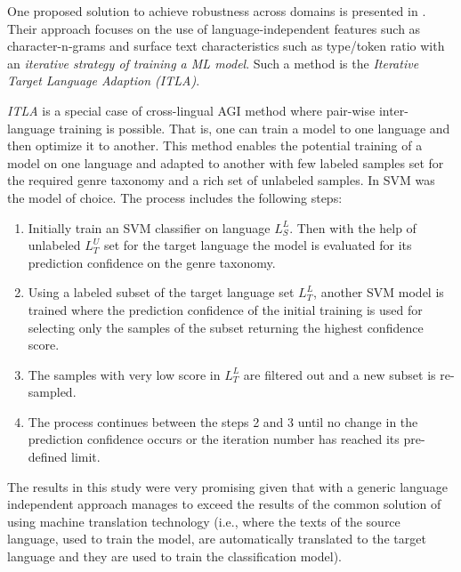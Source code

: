 One proposed solution to achieve robustness across domains is presented in \parencite{petrenz2011stable}. Their approach focuses on the use of language-independent features such as character-n-grams and surface text characteristics such as type/token ratio with an \textit{iterative strategy of training a ML model}. Such a method is the \textit{Iterative Target Language Adaption (ITLA)}. 

\textit{ITLA} is a special case of cross-lingual AGI method where pair-wise inter-language training is possible. That is, one can train a model to one language and then optimize it to another. This method enables the potential training of a model on one language and adapted to another with few labeled samples set for the required genre taxonomy and a rich set of unlabeled samples. In \parencite{petrenz2011stable} SVM was the model of choice. The process includes the following steps:

\begin{enumerate}
\item Initially train an SVM classifier on language $L^{L}_{S}$. Then with the help of unlabeled $L^{U}_{T}$ set for the target language the model is evaluated for its prediction confidence on the genre taxonomy.
\item Using a labeled subset of the target language set $L^{L}_{T}$, another SVM model is trained where the prediction confidence of the initial training is used for selecting only the samples of the subset returning the highest confidence score. 
\item The samples with very low score in $L^{L}_{T}$ are filtered out and a new subset is re-sampled.
\item The process continues between the steps 2 and 3 until no change in the prediction confidence occurs or the iteration number has reached its pre-defined limit.
\end{enumerate}

The results in this study were very promising given that with a generic language independent approach manages to exceed the results of the common solution of using machine translation technology (i.e., where the texts of the  source language, used to train the model, are automatically translated to the target language and they are used to train the classification model).

